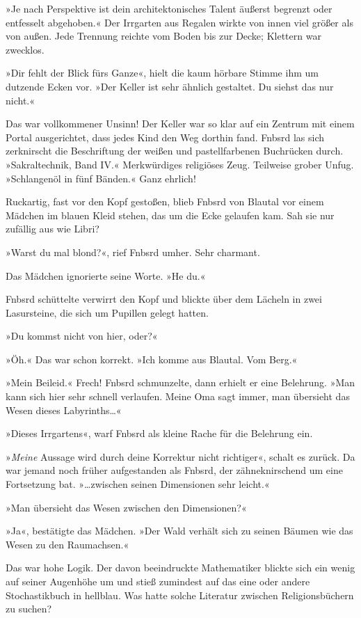 »Je nach Perspektive ist dein architektonisches Talent äußerst begrenzt oder entfesselt abgehoben.« Der Irrgarten aus Regalen wirkte von innen viel größer als von außen. Jede Trennung reichte vom Boden bis zur Decke; Klettern war zwecklos.

»Dir fehlt der Blick fürs Ganze«, hielt die kaum hörbare Stimme ihm um dutzende Ecken vor. »Der Keller ist sehr ähnlich gestaltet. Du siehst das nur nicht.«

Das war vollkommener Unsinn! Der Keller war so klar auf ein Zentrum mit einem Portal ausgerichtet, dass jedes Kind den Weg dorthin fand. Fnbsrd las sich zerknirscht die Beschriftung der weißen und pastellfarbenen Buchrücken durch. »Sakraltechnik, Band IV.« Merkwürdiges religiöses Zeug. Teilweise grober Unfug. »Schlangenöl in fünf Bänden.« Ganz ehrlich!

Ruckartig, fast vor den Kopf gestoßen, blieb Fnbsrd von Blautal vor einem Mädchen im blauen Kleid stehen, das um die Ecke gelaufen kam. Sah sie nur zufällig aus wie Libri?

»Warst du mal blond?«, rief Fnbsrd umher. Sehr charmant.

Das Mädchen ignorierte seine Worte. »He du.«

Fnbsrd schüttelte verwirrt den Kopf und blickte über dem Lächeln in zwei Lasursteine, die sich um Pupillen gelegt hatten.

»Du kommst nicht von hier, oder?«

»Öh.« Das war schon korrekt. »Ich komme aus Blautal. Vom Berg.«

»Mein Beileid.« Frech! Fnbsrd schmunzelte, dann erhielt er eine Belehrung. »Man kann sich hier sehr schnell verlaufen. Meine Oma sagt immer, man übersieht das Wesen dieses Labyrinths…«

»Dieses Irrgartens«, warf Fnbsrd als kleine Rache für die Belehrung ein.

»\emph{Meine} Aussage wird durch deine Korrektur nicht richtiger«, schalt es zurück. Da war jemand noch früher aufgestanden als Fnbsrd, der zähneknirschend um eine Fortsetzung bat. »…zwischen seinen Dimensionen sehr leicht.«

»Man übersieht das Wesen zwischen den Dimensionen?«

»Ja«, bestätigte das Mädchen. »Der Wald verhält sich zu seinen Bäumen wie das Wesen zu den Raumachsen.«

Das war hohe Logik. Der davon beeindruckte Mathematiker blickte sich ein wenig auf seiner Augenhöhe um und stieß zumindest auf das eine oder andere Stochastikbuch in hellblau. Was hatte solche Literatur zwischen Religionsbüchern zu suchen?

